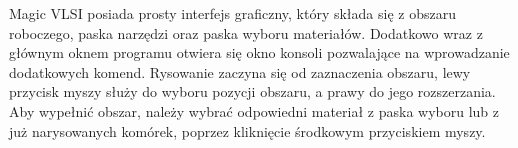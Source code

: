 \indent Magic VLSI posiada prosty interfejs graficzny,
który składa się z obszaru roboczego, paska narzędzi oraz paska wyboru materiałów.
Dodatkowo wraz z głównym oknem programu otwiera się okno konsoli pozwalające na wprowadzanie dodatkowych komend.
Rysowanie zaczyna się od zaznaczenia obszaru, lewy przycisk myszy służy do wyboru pozycji obszaru,
a prawy do jego rozszerzania.
Aby wypełnić obszar, należy wybrać odpowiedni materiał z paska wyboru
lub z już narysowanych komórek,
poprzez kliknięcie środkowym przyciskiem myszy.

